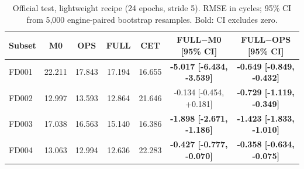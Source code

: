 \begin{table}[t]
\centering
\caption{Official test, lightweight recipe (24 epochs, stride 5). RMSE in cycles; 95\% CI from 5,000 engine-paired bootstrap resamples. Bold: CI excludes zero.}
\label{tab:light}
\begin{tabular}{lcccccc}
\toprule
Subset & M0 & OPS & FULL & CET & FULL$-$M0 [95\% CI] & FULL$-$OPS [95\% CI] \\
\midrule
FD001 & 22.211 & 17.843 & 17.194 & 16.655 & \textbf{-5.017 [-6.434, -3.539]} & \textbf{-0.649 [-0.849, -0.432]} \\
FD002 & 12.997 & 13.593 & 12.864 & 21.646 & -0.134 [-0.454, +0.181] & \textbf{-0.729 [-1.119, -0.349]} \\
FD003 & 17.038 & 16.563 & 15.140 & 16.386 & \textbf{-1.898 [-2.671, -1.186]} & \textbf{-1.423 [-1.833, -1.010]} \\
FD004 & 13.063 & 12.994 & 12.636 & 22.283 & \textbf{-0.427 [-0.777, -0.070]} & \textbf{-0.358 [-0.634, -0.075]} \\
\bottomrule
\end{tabular}
\end{table}
